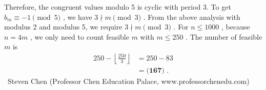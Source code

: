 \documentclass[12pt]{article}
\begin{document}
Therefore, the congruent values modulo 5 is cyclic with period 3.
To get $b_m \equiv -1 \pmod{5}$ , we have $3 \nmid m \pmod{3}$ . From the above analysis with modulus 2 and modulus 5, we require $3 \nmid m \pmod{3}$ . For $n \leq 1000$ , because $n = 4m$ , we only need to count feasible $m$ with $m \leq 250$ .
The number of feasible $m$ is \begin{align*} 250 - \left\lfloor \frac{250}{3} \right\rfloor & = 250 - 83 \\ & = \boxed{\textbf{(167) }} . \end{align*} ~Steven Chen (Professor Chen Education Palace, www.professorchenedu.com)
\end{document}
